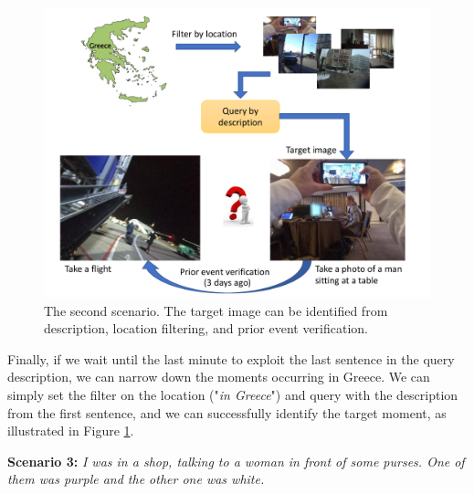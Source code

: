 \begin{figure}[t]
    \centering
    \includegraphics[width=1\columnwidth]{content/resources/images/methods/CaseStudy2Overview.pdf}
    \caption{The second scenario. The target image can be identified from description, location filtering, and prior event verification.}
    \label{fig:CaseStudy2}
\end{figure}

\vspace{-2mm} 
Finally, if we wait until the last minute to exploit the last sentence in the query description, we can narrow down the moments occurring in Greece. We can simply set the filter on the location ("\textit{in Greece}") and query with the description from the first sentence, and we can successfully identify the target moment, as illustrated in Figure \ref{fig:CaseStudy2}.

\textbf{Scenario 3:} \textit{I was in a shop, talking to a woman in front of some purses. One of them was purple and the other one was white.}

